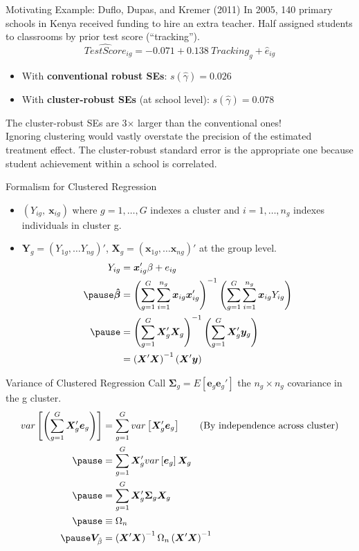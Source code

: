 \documentclass[aspectratio=169, handout, t]{beamer}
\numberwithin{equation}{section}
\begin{document}
\begin{frame}{Motivating Example: Duflo, Dupas, and Kremer (2011)}
In 2005, 140 primary schools in Kenya received funding to hire an extra teacher. Half assigned students to classrooms by prior test score (``tracking'').
$$\widehat{TestScore}_{ig}=-0.071+0.138\ Tracking_g+\hat{e}_{ig}$$
\pause
\begin{itemize}
\item With \textbf{conventional robust SEs}: $s(\hat{\gamma})=0.026$
\item With \textbf{cluster-robust SEs} (at school level): $s(\hat{\gamma})=0.078$
\end{itemize}
\pause
\medskip
The cluster-robust SEs are \alert{3$\times$ larger} than the conventional ones!\\[6pt]
Ignoring clustering would vastly overstate the precision of the estimated treatment effect.  The cluster-robust standard error is the appropriate one because student achievement within a school is correlated.
\end{frame}

\begin{frame}{Formalism for Clustered Regression}
\begin{itemize}
\item $(Y_{ig},\ \bm{x}_{ig})$ where $g=1, \ldots, G$ indexes a cluster and $i=1,\ldots, n_g$ indexes individuals in cluster g. \pause
\item $\bm{Y}_g=(Y_{1g},\ldots Y_{ng})'$, $\bm{X}_g=(\bm{x}_{1g},\ldots \bm{x}_{ng})'$ at the group level. \pause
\begin{align*}
Y_{ig}&=\bm{x}_{ig}'\beta+e_{ig}\\ \pause
\bm{\hat{\beta}}&=\left(\sum_{g=1}^G \sum_{i=1}^{n_g}\bm{x}_{ig}\bm{x}_{ig}'\right)^{-1}\left(\sum_{g=1}^G \sum_{i=1}^{n_g}\bm{x}_{ig}Y_{ig}\right)\\ \pause
&=\left(\sum_{g=1}^G \bm{X}'_{g}\bm{X}_{g}\right)^{-1}\left(\sum_{g=1}^G \bm{X}'_{g}\bm{y}_{g}\right)\\
&=\left(\bm{X}'\bm{X}\right)^{-1}\left(\bm{X}'\bm{y}\right)
\end{align*}

\end{itemize}
\end{frame}



\begin{frame}{Variance of Clustered Regression}
Call $\bm{\Sigma}_g=E\left[\bm{e}_g\bm{e}_g'\right]$ the $n_g\times n_g$ covariance in the g cluster. \pause
\begin{align*}
var\left[\left(\sum_{g=1}^G \bm{X}_g'\bm{e}_g\right)\right]&=\sum_{g=1}^G var\left[\bm{X}_g'\bm{e}_g\right] \tag{By independence across cluster}\\ \pause
&=\sum_{g=1}^G \bm{X}_g'var\left[\bm{e}_g\right]\bm{X}_g\\ \pause
&=\sum_{g=1}^G \bm{X}_g'\bm{\Sigma}_g\bm{X}_g\\ \pause
&\equiv \Omega_n\\ \pause
\bm{V}_{\hat{\beta}}&=\left(\bm{X}'\bm{X}\right)^{-1}\Omega_n\left(\bm{X}'\bm{X}\right)^{-1}
\end{align*}
\end{frame}
\end{document}
